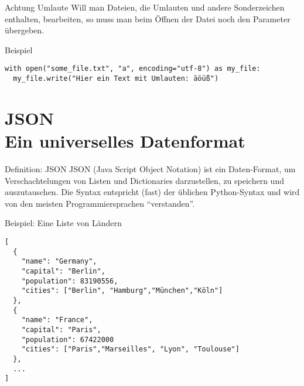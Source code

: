 \begin{fragile}
	
\begin{alertblock}{Achtung Umlaute}
\vspace{2pt}
Will man Dateien, die Umlauten und andere Sonderzeichen enthalten, bearbeiten, so muss man beim Öffnen der Datei noch den Parameter  übergeben. 
\end{alertblock}	

 \vspace{12pt}
 
\begin{exampleblock}{Beispiel}
	\vspace{2pt}
\begin{verbatim}
with open("some_file.txt", "a", encoding="utf-8") as my_file:
  my_file.write("Hier ein Text mit Umlauten: äöüß")
\end{verbatim}
\end{exampleblock}

	
\end{fragile}


\section{JSON \\ \footnotesize Ein universelles Datenformat}

\begin{frame}

\begin{block}{Definition: JSON}
\vspace{2pt}	
JSON (Java Script Object Notation) ist ein Daten-Format, um Verschachtelungen von Listen und Dictionaries darzustellen, zu speichern und auszutauschen. Die Syntax entspricht (fast) der üblichen Python-Syntax und wird von den meisten Programmiersprachen \enquote{verstanden}.  
\end{block}
\end{frame}

\begin{fragile}
	
\begin{exampleblock}{Beispiel: Eine Liste von Ländern}
\vspace{2pt}
\begin{verbatim}
[
  {
    "name": "Germany",
    "capital": "Berlin",
    "population": 83190556,
    "cities": ["Berlin", "Hamburg","München","Köln"] 
  },
  {
    "name": "France", 
    "capital": "Paris",
    "population": 67422000
    "cities": ["Paris","Marseilles", "Lyon", "Toulouse"]
  },
  ...
]
\end{verbatim}
\end{exampleblock}
\end{fragile}

